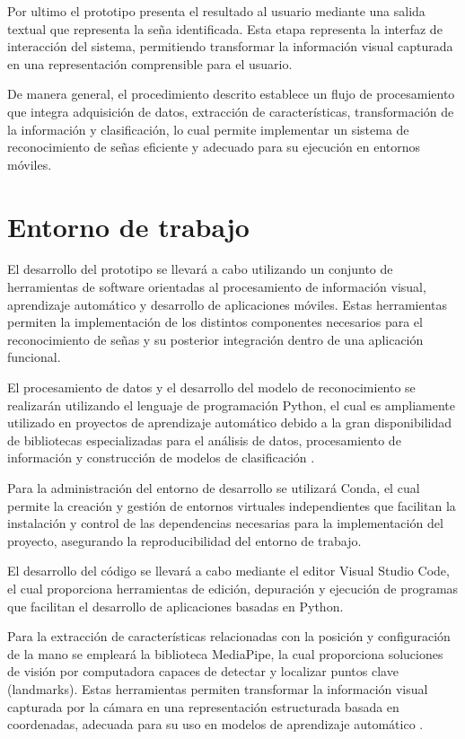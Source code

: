 	Por ultimo el prototipo presenta el resultado al usuario mediante una salida
	textual que representa la seña identificada. Esta etapa representa la
	interfaz de interacción del sistema, permitiendo transformar la información
	visual capturada en una representación comprensible para el usuario.
	
	De manera general, el procedimiento descrito establece un flujo de procesamiento
	que integra adquisición de datos, extracción de características, transformación
	de la información y clasificación, lo cual permite implementar un sistema de
	reconocimiento de señas eficiente y adecuado para su ejecución en entornos
	móviles.
	
	\section{Entorno de trabajo}
	
	El desarrollo del prototipo se llevará a cabo utilizando un conjunto de
	herramientas de software orientadas al procesamiento de información visual,
	aprendizaje automático y desarrollo de aplicaciones móviles. Estas
	herramientas permiten la implementación de los distintos componentes
	necesarios para el reconocimiento de señas y su posterior integración
	dentro de una aplicación funcional.
	
	El procesamiento de datos y el desarrollo del modelo de reconocimiento se
	realizarán utilizando el lenguaje de programación Python, el cual es
	ampliamente utilizado en proyectos de aprendizaje automático debido a la
	gran disponibilidad de bibliotecas especializadas para el análisis de datos,
	procesamiento de información y construcción de modelos de clasificación
	\cite{python,geron2019}.
	
	Para la administración del entorno de desarrollo se utilizará Conda, el cual
	permite la creación y gestión de entornos virtuales independientes que
	facilitan la instalación y control de las dependencias necesarias para la
	implementación del proyecto, asegurando la reproducibilidad del entorno de
	trabajo.
	
	El desarrollo del código se llevará a cabo mediante el editor Visual Studio
	Code, el cual proporciona herramientas de edición, depuración y ejecución de
	programas que facilitan el desarrollo de aplicaciones basadas en Python.
	
	Para la extracción de características relacionadas con la posición y
	configuración de la mano se empleará la biblioteca MediaPipe, la cual
	proporciona soluciones de visión por computadora capaces de detectar y
	localizar puntos clave (landmarks). Estas
	herramientas permiten transformar la información visual capturada por la
	cámara en una representación estructurada basada en coordenadas, adecuada
	para su uso en modelos de aprendizaje automático \cite{lugaresi2019mediapipe,zhang2020mediapipehands}.
	
